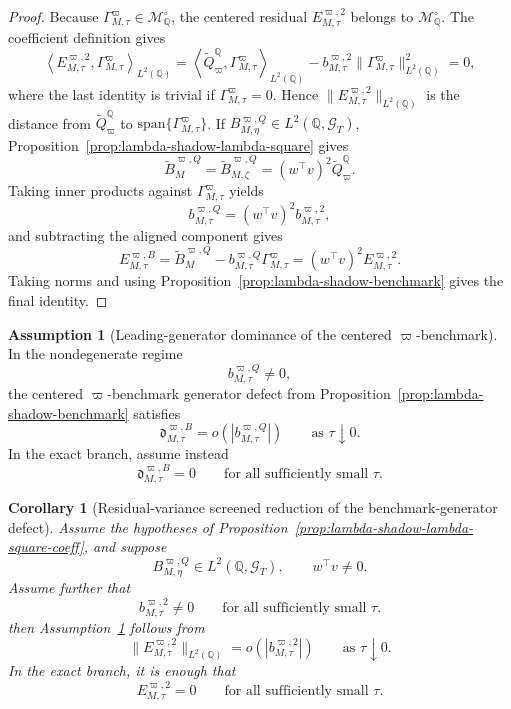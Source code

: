 \documentclass[11pt,a4paper]{amsart}
\theoremstyle{plain}
\newtheorem{corollary}[theorem]{Corollary}
\theoremstyle{definition}
\newtheorem{assumption}[theorem]{Assumption}
\theoremstyle{remark}
\newcommand{\QQ}{\mathbb{Q}}
\newcommand{\cG}{\mathcal{G}}
\newcommand{\cM}{\mathcal{M}}
\begin{document}
\begin{proof}
Because \(\Gamma_{M,\tau}^\varpi\in \cM_\QQ^\circ\), the centered residual
\(E_{M,\tau}^{\varpi,2}\) belongs to \(\cM_\QQ^\circ\).  The coefficient definition gives
\[
        \left\langle
                E_{M,\tau}^{\varpi,2},
                \Gamma_{M,\tau}^\varpi
        \right\rangle_{L^2(\QQ)}
        =
        \left\langle
                \widetilde Q_{\varpi}^\QQ,
                \Gamma_{M,\tau}^\varpi
        \right\rangle_{L^2(\QQ)}
        -
        b_{M,\tau}^{\varpi,2}
        \|\Gamma_{M,\tau}^\varpi\|_{L^2(\QQ)}^2
        =
        0,
\]
where the last identity is trivial if \(\Gamma_{M,\tau}^\varpi=0\).  Hence
\(\|E_{M,\tau}^{\varpi,2}\|_{L^2(\QQ)}\) is the distance from
\(\widetilde Q_{\varpi}^\QQ\) to \(\mathrm{span}\{\Gamma_{M,\tau}^\varpi\}\).
If \(B_{M,\eta}^{\varpi,Q}\in L^2(\QQ,\cG_T)\), Proposition~\ref{prop:lambda-shadow-lambda-square}
gives
\[
        \widetilde B_{M}^{\varpi,Q}
        =
        \widetilde B_{M,\zeta}^{\varpi,Q}
        =
        (w^\top v)^2\widetilde Q_{\varpi}^\QQ.
\]
Taking inner products against \(\Gamma_{M,\tau}^\varpi\) yields
\[
        b_{M,\tau}^{\varpi,Q}
        =
        (w^\top v)^2 b_{M,\tau}^{\varpi,2},
\]
and subtracting the aligned component gives
\[
        E_{M,\tau}^{\varpi,B}
        =
        \widetilde B_{M}^{\varpi,Q}
        -
        b_{M,\tau}^{\varpi,Q}\Gamma_{M,\tau}^\varpi
        =
        (w^\top v)^2 E_{M,\tau}^{\varpi,2}.
\]
Taking norms and using Proposition~\ref{prop:lambda-shadow-benchmark} gives the final identity.
\end{proof}

\begin{assumption}[Leading-generator dominance of the centered \(\varpi\)-benchmark]\label{ass:lambda-benchmark-generator}
In the nondegenerate regime
\[
        b_{M,\tau}^{\varpi,Q}\neq0,
\]
the centered \(\varpi\)-benchmark generator defect from
Proposition~\ref{prop:lambda-shadow-benchmark} satisfies
\[
        \mathfrak d_{M,\tau}^{\varpi,B}
        =
        o\!\left(|b_{M,\tau}^{\varpi,Q}|\right)
        \qquad
        \text{as }\tau\downarrow0.
\]
In the exact branch, assume instead
\[
        \mathfrak d_{M,\tau}^{\varpi,B}=0
        \qquad
        \text{for all sufficiently small }\tau.
\]
\end{assumption}

\begin{corollary}[Residual-variance screened reduction of the benchmark-generator defect]\label{cor:lambda-shadow-lambda-square}
Assume the hypotheses of Proposition~\ref{prop:lambda-shadow-lambda-square-coeff}, and suppose
\[
        B_{M,\eta}^{\varpi,Q}\in L^2(\QQ,\cG_T),
        \qquad
        w^\top v\neq0.
\]
Assume further that
\[
        b_{M,\tau}^{\varpi,2}\neq0
        \qquad
        \text{for all sufficiently small }\tau.
\]
then Assumption~\ref{ass:lambda-benchmark-generator} follows from
\[
        \|E_{M,\tau}^{\varpi,2}\|_{L^2(\QQ)}
        =
        o\!\left(|b_{M,\tau}^{\varpi,2}|\right)
        \qquad
        \text{as }\tau\downarrow0.
\]
In the exact branch, it is enough that
\[
        E_{M,\tau}^{\varpi,2}=0
        \qquad
        \text{for all sufficiently small }\tau.
\]
\end{corollary}
\end{document}
